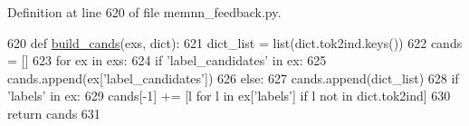 Definition at line 620 of file memnn\+\_\+feedback.\+py.


\begin{DoxyCode}
620 \textcolor{keyword}{def }\hyperlink{namespaceprojects_1_1memnn__feedback_1_1agent_1_1memnn__feedback_a098f9dace138acef711a30ce16831284}{build\_cands}(exs, dict):
621     dict\_list = list(dict.tok2ind.keys())
622     cands = []
623     \textcolor{keywordflow}{for} ex \textcolor{keywordflow}{in} exs:
624         \textcolor{keywordflow}{if} \textcolor{stringliteral}{'label\_candidates'} \textcolor{keywordflow}{in} ex:
625             cands.append(ex[\textcolor{stringliteral}{'label\_candidates'}])
626         \textcolor{keywordflow}{else}:
627             cands.append(dict\_list)
628             \textcolor{keywordflow}{if} \textcolor{stringliteral}{'labels'} \textcolor{keywordflow}{in} ex:
629                 cands[-1] += [l \textcolor{keywordflow}{for} l \textcolor{keywordflow}{in} ex[\textcolor{stringliteral}{'labels'}] \textcolor{keywordflow}{if} l \textcolor{keywordflow}{not} \textcolor{keywordflow}{in} dict.tok2ind]
630     \textcolor{keywordflow}{return} cands
631 \end{DoxyCode}
